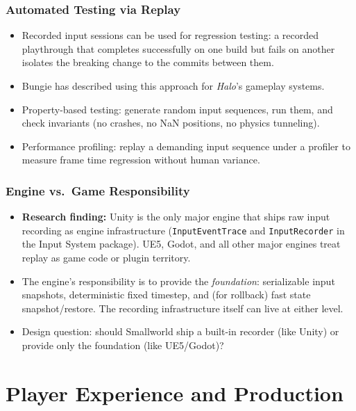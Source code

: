 \documentclass[
  11pt,
  letterpaper,
  DIV=11,
  numbers=noendperiod,
  twoside,
  open=right]{scrreprt}
\providecommand{\tightlist}{%
  \setlength{\itemsep}{0pt}\setlength{\parskip}{0pt}}
\begin{document}
\section{Automated Testing via
Replay}\label{automated-testing-via-replay}

\begin{itemize}
\tightlist
\item
  Recorded input sessions can be used for regression testing: a recorded
  playthrough that completes successfully on one build but fails on
  another isolates the breaking change to the commits between them.
\item
  Bungie has described using this approach for \emph{Halo}'s gameplay
  systems.
\item
  Property-based testing: generate random input sequences, run them, and
  check invariants (no crashes, no NaN positions, no physics tunneling).
\item
  Performance profiling: replay a demanding input sequence under a
  profiler to measure frame time regression without human variance.
\end{itemize}

\section{Engine vs.~Game
Responsibility}\label{engine-vs.-game-responsibility}

\begin{itemize}
\tightlist
\item
  \textbf{Research finding:} Unity is the only major engine that ships
  raw input recording as engine infrastructure (\texttt{InputEventTrace}
  and \texttt{InputRecorder} in the Input System package). UE5, Godot,
  and all other major engines treat replay as game code or plugin
  territory.
\item
  The engine's responsibility is to provide the \emph{foundation}:
  serializable input snapshots, deterministic fixed timestep, and (for
  rollback) fast state snapshot/restore. The recording infrastructure
  itself can live at either level.
\item
  Design question: should Smallworld ship a built-in recorder (like
  Unity) or provide only the foundation (like UE5/Godot)?
\end{itemize}

\part{Player Experience and Production}
\end{document}
